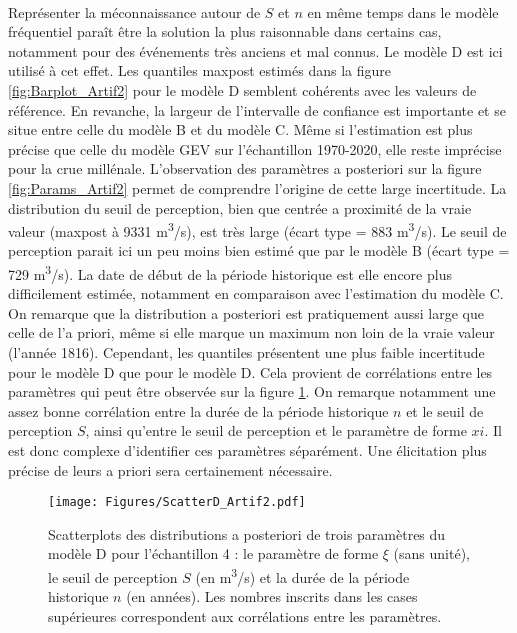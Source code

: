 \documentclass[11pt]{article}
\begin{document}
	\paragraph{} Représenter la méconnaissance autour de $S$ et $n$ en même temps dans le modèle fréquentiel paraît être la solution la plus raisonnable dans certains cas, notamment pour des événements très anciens et mal connus. Le modèle D est ici utilisé à cet effet. Les quantiles maxpost estimés dans la figure \ref{fig:Barplot_Artif2} pour le modèle D semblent cohérents avec les valeurs de référence. En revanche, la largeur de l'intervalle de confiance est importante et se situe entre celle du modèle B et du modèle C. Même si l'estimation est plus précise que celle du modèle GEV sur l'échantillon 1970-2020, elle reste imprécise pour la crue millénale. L'observation des paramètres a posteriori sur la figure \ref{fig:Params_Artif2} permet de comprendre l'origine de cette large incertitude. La distribution du seuil de perception, bien que centrée a proximité de la vraie valeur (maxpost à 9331 m\textsuperscript{3}/s), est très large (écart type = 883 m\textsuperscript{3}/s). Le seuil de perception parait ici un peu moins bien estimé que par le modèle B (écart type = 729 m\textsuperscript{3}/s). La date de début de la période historique est elle encore plus difficilement estimée, notamment en comparaison avec l'estimation du modèle C. On remarque que la distribution a posteriori est pratiquement aussi large que celle de l'a priori, même si elle marque un maximum non loin de la vraie valeur (l'année 1816). Cependant, les quantiles présentent une plus faible incertitude pour le modèle D que pour le modèle D. Cela provient de corrélations entre les paramètres qui peut être observée sur la figure \ref{fig:ScatterD_Artif2}. On remarque notamment une assez bonne corrélation entre la durée de la période historique $n$ et le seuil de perception $S$, ainsi qu'entre le seuil de perception et le paramètre de forme $xi$. Il est donc complexe d'identifier ces paramètres séparément. Une élicitation plus précise de leurs a priori sera certainement nécessaire.
	
	\begin{figure}[h]
		\centering
		\texttt{[image: Figures/ScatterD\_Artif2.pdf]}
		\caption{Scatterplots des distributions a posteriori de trois paramètres du modèle D pour l'échantillon 4 : le paramètre de forme $\xi$ (sans unité), le seuil de perception $S$ (en m\textsuperscript{3}/s) et la durée de la période historique $n$ (en années). Les nombres inscrits dans les cases supérieures correspondent aux corrélations entre les paramètres.}
		\label{fig:ScatterD_Artif2}
	\end{figure}
		
\end{document}

